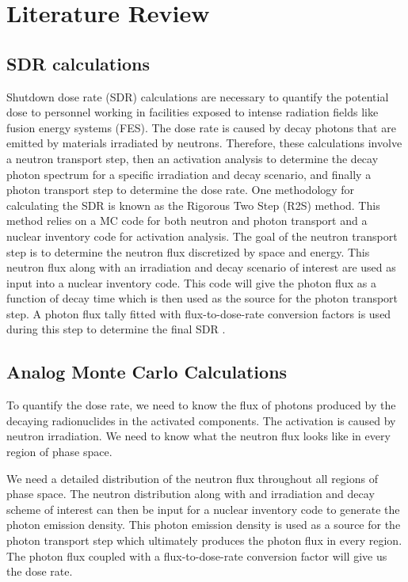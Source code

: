 \chapter{Literature Review} \label{ch:litrev}

\section{SDR calculations}\label{sec:sdr_calcs}
Shutdown dose rate (SDR) calculations are necessary to quantify the potential
dose to personnel working in facilities exposed to intense radiation fields
like fusion energy systems (FES).  The dose rate is caused by decay photons
that are emitted by materials irradiated by neutrons.  Therefore, these calculations involve a neutron
transport step, then an activation analysis to determine the decay photon
spectrum for a specific irradiation and decay scenario,
and finally a photon transport step to determine the dose rate.
One methodology for calculating the SDR is known as the Rigorous Two Step (R2S)
method.  This method relies on a MC code for both neutron and photon transport
and a nuclear inventory code for activation analysis.
The goal of the neutron transport step is to determine the neutron flux
discretized by space and energy.  This neutron flux along with an irradiation
and decay scenario of interest are used as input into a nuclear inventory
code.  This code will give the photon flux as a function of decay time which
is then used as the source for the photon transport step.  A photon flux tally
fitted with flux-to-dose-rate conversion factors is used during this step to
determine the final SDR \cite{Chen_2002}.


\section{Analog Monte Carlo Calculations} \label{sec:analog_mc}

To quantify the dose rate, we need to know the flux of photons
produced by the decaying radionuclides in the activated components. The
activation is caused by neutron irradiation.
We need to know what the neutron flux looks like in every region of phase
space.

We need a detailed distribution of the neutron flux throughout all regions of phase
space.
The neutron distribution along with and irradiation and decay scheme of interest 
can then be input for a nuclear inventory code to generate the photon
emission density.  This photon emission density is used as a source for the
photon transport step which ultimately produces the photon flux in every region.
The photon flux coupled with a flux-to-dose-rate conversion factor will give us
the dose rate.


